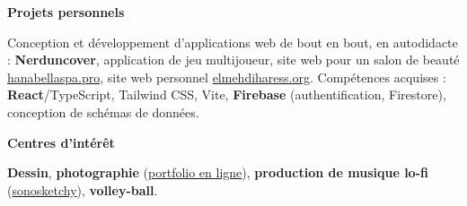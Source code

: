 \documentclass[10pt,a4paper]{article}
\newlength{\datecol}\setlength{\datecol}{0.165\textwidth}
\newlength{\gutter}\setlength{\gutter}{1em}
\newlength{\bodycol}
\newcommand{\skillrow}[2]{%
  \par\noindent
  \begin{minipage}[t]{\datecol}
    \vspace{0pt}\raggedright{\headingfont\bfseries\footnotesize #1}
  \end{minipage}%
  \hspace{\gutter}%
  \begin{minipage}[t]{\bodycol}
    \vspace{0pt}\raggedright\small #2
  \end{minipage}%
  \par\vspace{0.7ex}
}
\begin{document}
\skillrow{Projets personnels}{Conception et développement d'applications web de bout en bout, en autodidacte :
\textbf{Nerduncover}, application de jeu multijoueur, site web pour un salon de beauté \href{https://hanabellaspa.pro}{hanabellaspa.pro}, site web personnel
\href{https://elmehdiharess.org}{elmehdiharess.org}. Compétences acquises : \textbf{React}/TypeScript,
Tailwind CSS, Vite, \textbf{Firebase} (authentification, Firestore), conception de schémas de données.}
\skillrow{Centres d'intérêt}{\textbf{Dessin}, \textbf{photographie}
(\href{https://elmehdiharess.org/photography}{portfolio en ligne}), \textbf{production de musique lo-fi}
(\href{https://www.youtube.com/@sonosketchy}{sonosketchy}), \textbf{volley-ball}.}
\end{document}
